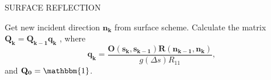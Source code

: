 \begin{minipage}{7cm}
\begin{sf}
SURFACE REFLECTION

Get new incident direction $\mathbf{n_k}$ from surface scheme.
Calculate the matrix $\mathbf{Q_k}=\mathbf{Q_{k-1}q_k}$
, where
\[
\mathbf{q_k}=\frac{\mathbf{O(s_k,s_{k-1})}\mathbf{R(n_{k-1},n_k)}}
  {g\left(\Delta s\right)R_{11}} ,
\]
and $\mathbf{Q_0}=\mathbbm{1}$.
\end{sf}
\end{minipage}
